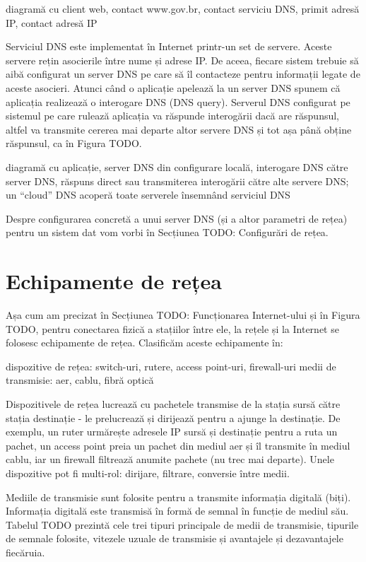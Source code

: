 diagramă cu client web, contact www.gov.br, contact serviciu DNS, primit adresă IP, contact adresă IP

Serviciul DNS este implementat în Internet printr-un set de servere. Aceste servere rețin asocierile între nume și adrese IP. De aceea, fiecare sistem trebuie să aibă configurat un server DNS pe care să îl contacteze pentru informații legate de aceste asocieri. Atunci când o aplicație apelează la un server DNS spunem că aplicația realizează o interogare DNS (DNS query). Serverul DNS configurat pe sistemul pe care rulează aplicația va răspunde interogării dacă are răspunsul, altfel va transmite cererea mai departe altor servere DNS și tot așa până obține răspunsul, ca în Figura TODO.

diagramă cu aplicație, server DNS din configurare locală, interogare DNS către server DNS, răspuns direct sau transmiterea interogării către alte servere DNS; un “cloud” DNS acoperă toate serverele însemnând serviciul DNS

Despre configurarea concretă a unui server DNS (și a altor parametri de rețea) pentru un sistem dat vom vorbi în Secțiunea TODO: Configurări de rețea.

\section{Echipamente de rețea}
\label{sec:net:equipment}

Așa cum am precizat în Secțiunea TODO: Funcționarea Internet-ului și în Figura TODO, pentru conectarea fizică a stațiilor între ele, la rețele și la Internet se folosesc echipamente de rețea. Clasificăm aceste echipamente în:

dispozitive de rețea: switch-uri, rutere, access point-uri, firewall-uri
medii de transmisie: aer, cablu, fibră optică

Dispozitivele de rețea lucrează cu pachetele transmise de la stația sursă către stația destinație - le prelucrează și dirijează pentru a ajunge la destinație. De exemplu, un ruter urmărește adresele IP sursă și destinație pentru a ruta un pachet, un access point preia un pachet din mediul aer și îl transmite în mediul cablu, iar un firewall filtrează anumite pachete (nu trec mai departe). Unele dispozitive pot fi multi-rol: dirijare, filtrare, conversie între medii.

Mediile de transmisie sunt folosite pentru a transmite informația digitală (biți). Informația digitală este transmisă în formă de semnal în funcție de mediul său. Tabelul TODO prezintă cele trei tipuri principale de medii de transmisie, tipurile de semnale folosite, vitezele uzuale de transmisie și avantajele și dezavantajele fiecăruia.

